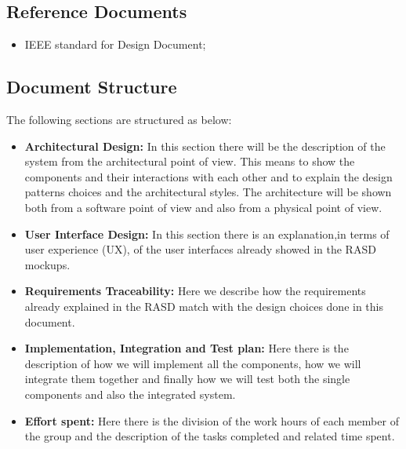 \documentclass[titlepage]{article}
\begin{document}
\subsection{Reference Documents}
\begin{itemize}
\item IEEE standard for Design Document;
\end{itemize}
\subsection{Document Structure}
The following sections are structured as below:
\begin{itemize}
	\item \textbf{Architectural Design: }In this section there will be the description of the system from the architectural point of view. This means to show the components and their interactions with each other and to explain the design patterns choices and the architectural styles. The architecture will be shown both from a software point of view and also from a physical point of view.
	\item \textbf{User Interface Design:} In this section there is an explanation,in terms of user experience (UX), of the user interfaces already showed in the RASD mockups.
	\item \textbf{Requirements Traceability:} Here we describe how the requirements already explained in the RASD match with the design choices done in this document.
	\item \textbf{Implementation, Integration and Test plan:} Here there is the description of how we will implement all the components, how we will integrate them together and finally how we will test both the single components and also the integrated system.
	\item \textbf{Effort spent:} Here there is the division of the work hours of each member of the group and the description of the tasks completed and related time spent.
\end{itemize}
\end{document}
